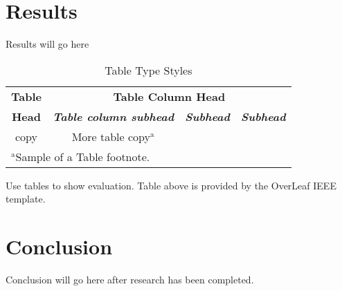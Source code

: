 \documentclass[conference]{IEEEtran}
\begin{document}
\section{Results}
Results will go here

\begin{table}[htbp]
\caption{Table Type Styles}
\begin{center}
\begin{tabular}{|c|c|c|c|}
\hline
\textbf{Table}&\multicolumn{3}{|c|}{\textbf{Table Column Head}} \\
\cline{2-4} 
\textbf{Head} & \textbf{\textit{Table column subhead}}& \textbf{\textit{Subhead}}& \textbf{\textit{Subhead}} \\
\hline
copy& More table copy$^{\mathrm{a}}$& &  \\
\hline
\multicolumn{4}{l}{$^{\mathrm{a}}$Sample of a Table footnote.}
\end{tabular}
\label{tab1}
\end{center}
\end{table}

Use tables to show evaluation. Table above is provided by the OverLeaf IEEE template.

\section{Conclusion}
Conclusion will go here after research has been completed.
\end{document}
